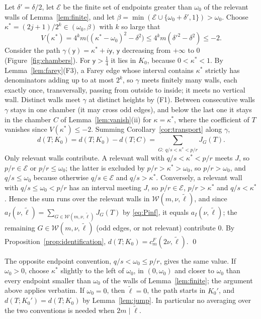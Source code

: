 Let $\delta'=\delta/2$, let $\mathcal E$ be the finite set of endpoints greater than $\omega_0$ of the relevant walls of Lemma~\ref{lem:finite}, and let $\beta=\min(\mathcal E\cup\{\omega_0+\delta',1\})>\omega_0$. Choose $\kappa^*=(2j+1)/2^k\in(\omega_0,\beta)$ with $k$ so large that
\[
V(\kappa^*)=4^km\big((\kappa^*-\omega_0)^2-\delta^2\big)\le4^km(\delta'^2-\delta^2)\le-2 .
\]
Consider the path $\gamma(\mathsf y)=\kappa^*+i\mathsf y$, $\mathsf y$ decreasing from $+\infty$ to $0$ (Figure~\ref{fig:chambers}). For $\mathsf y>\frac14$ it lies in $K_0$, because $0<\kappa^*<1$. By Lemma~\ref{lem:farey}(F3), a Farey edge whose interval contains $\kappa^*$ strictly has denominators adding up to at most $2^k$, so $\gamma$ meets finitely many walls, each exactly once, transversally, passing from outside to inside; it meets no vertical wall. Distinct walls meet $\gamma$ at distinct heights by (F1). Between consecutive walls $\gamma$ stays in one chamber (it may cross odd edges), and below the last one it stays in the chamber $C$ of Lemma~\ref{lem:vanish}(ii) for $\kappa=\kappa^*$, where the coefficient of $T$ vanishes since $V(\kappa^*)\le-2$. Summing Corollary~\ref{cor:transport} along $\gamma$,
\[
d(T;K_0)=d(T;K_0)-d(T;C)=\sum_{G:\ q/s<\kappa^*<p/r}J_G(T).
\]
Only relevant walls contribute. A relevant wall with $q/s<\kappa^*<p/r$ meets $J$, so $p/r\in\mathcal E$ or $p/r\le\omega_0$; the latter is excluded by $p/r>\kappa^*>\omega_0$, so $p/r>\omega_0$, and $q/s\le\omega_0$ because otherwise $q/s\in\mathcal E$ and $q/s>\kappa^*$. Conversely, a relevant wall with $q/s\le\omega_0<p/r$ has an interval meeting $J$, so $p/r\in\mathcal E$, $p/r>\kappa^*$ and $q/s<\kappa^*$. Hence the sum runs over the relevant walls in $\mathcal W(m,\nu,\tilde\ell)$, and since $a_I(\nu,\tilde\ell)=\sum_{G\in\mathcal W(m,\nu,\tilde\ell)}J_G(T)$ by \eqref{eq:Pinf}, it equals $a_I(\nu,\tilde\ell)$; the remaining $G\in\mathcal W(m,\nu,\tilde\ell)$ (odd edges, or not relevant) contribute $0$. By Proposition~\ref{prop:identification}, $d(T;K_0)=c^F_m(2\nu,\tilde\ell)$. \qed

\begin{remark}\label{rem:convention}
The opposite endpoint convention, $q/s<\omega_0\le p/r$, gives the same value. If $\omega_0>0$, choose $\kappa^*$ slightly to the left of $\omega_0$, in $(0,\omega_0)$ and closer to $\omega_0$ than every endpoint smaller than $\omega_0$ of the walls of Lemma~\ref{lem:finite}; the argument above applies verbatim. If $\omega_0=0$, then $\tilde\ell=0$, the path starts in $K_0'$, and $d(T;K_0')=d(T;K_0)$ by Lemma~\ref{lem:jump}. In particular no averaging over the two conventions is needed when $2m\mid\tilde\ell$.
\end{remark}


